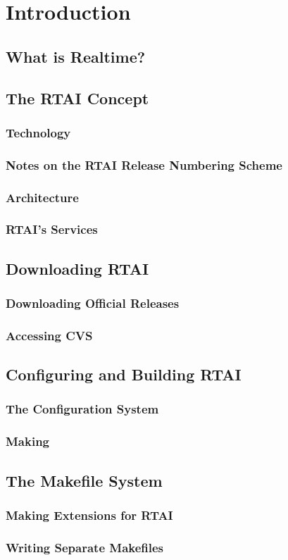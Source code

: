 \chapter{Introduction}

\section{What is Realtime?}

\section{The RTAI Concept}
\subsection{Technology}
\subsection{Notes on the RTAI Release Numbering Scheme}
\subsection{Architecture}
\subsection{RTAI's Services}

\section{Downloading RTAI}
\subsection{Downloading Official Releases}
\subsection{Accessing CVS}

\section{Configuring and Building RTAI}
\subsection{The Configuration System}
\subsection{Making}

\section{The Makefile System}
\subsection{Making Extensions for RTAI}
\subsection{Writing Separate Makefiles}
